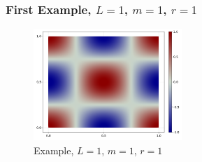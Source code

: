\subsubsection{First Example, $L=1$, $m=1$, $r=1$}%
\label{sub:first_example}

\begin{figure}[tbh!]
    \centering
    \includegraphics[width=0.5\textwidth]{figures/model/l_1.0_m_1_r_1n_100_sol.png}
    \caption{Example, $L=1$, $m=1$, $r=1$}
    \label{fig:sol_l1_m1_r1}
\end{figure}


